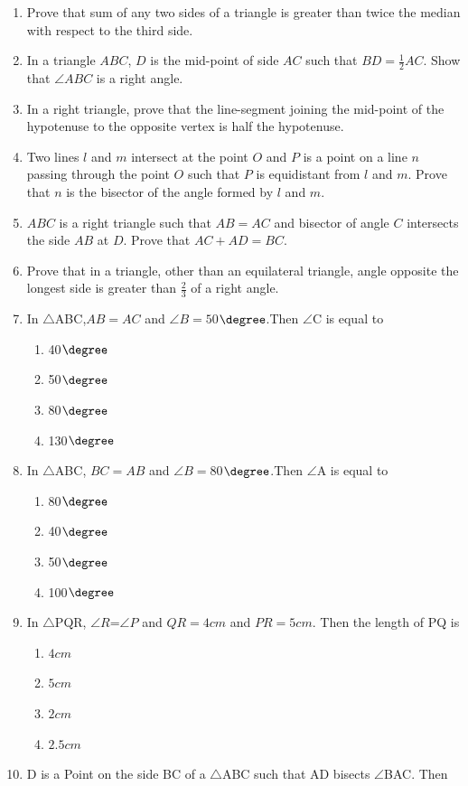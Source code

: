 \begin{enumerate}[label=\arabic*.,ref=\thesubsection.\theenumi]
\item Prove that sum of any two sides of a triangle is greater than twice the median with respect to the third side.
\item In a triangle $ABC$, $D$ is the mid-point of side $AC$ such that $ BD = \frac{1}{2} AC $. Show that $\angle ABC$ is a right angle.
\item In a right triangle, prove that the line-segment joining the mid-point of the hypotenuse to the opposite vertex is half the hypotenuse.
\item Two lines $l$ and $m$ intersect at the point $O$ and $P$ is a point on a line $n$ passing through the point $O$ such that $P$ is equidistant from $l$ and $m$. Prove that $n$ is the bisector of the angle formed by $l$ and $m$.
\item $ABC$ is a right triangle such that $AB = AC$ and bisector of angle $C$ intersects the side $AB$ at $D$. Prove that $AC + AD = BC$.
\item Prove that in a triangle, other than an equilateral triangle, angle opposite the longest side is greater than $\frac{2}{3}$ of a right angle.
\item In $\triangle$ABC,$AB=AC$ and $\angle$$B=50$$\degree$.Then $\angle$C is equal to
\begin{enumerate}
\item 40$\degree$
\item 50$\degree$
\item 80$\degree$
\item 130$\degree$
\end{enumerate}
\item In $\triangle$ABC, $BC=AB$ and $\angle$$B=80$$\degree$.Then $\angle$A is equal to
\begin{enumerate}
\item 80$\degree$
\item 40$\degree$
\item 50$\degree$
\item 100$\degree$
\end{enumerate}
\item In $\triangle$PQR, $\angle$$R$=$\angle$$P$ and $QR=4cm$ and $PR=5cm$. Then the length of PQ is
\begin{enumerate}
\item $4cm$
\item $5cm$
\item $2cm$
\item $2.5cm$
\end{enumerate}
\item D is a Point on the side BC of a $\triangle$ABC such that AD bisects $\angle$BAC. Then

\end{enumerate}
